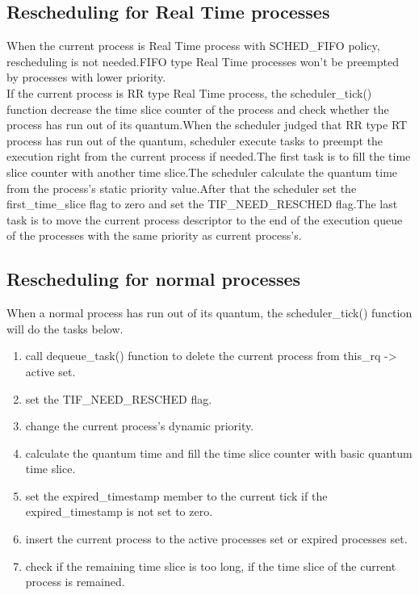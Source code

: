 \documentclass[10pt,a4paper]{ltjsarticle}       %
\begin{document}
\subsection{Rescheduling for Real Time processes}
When the current process is Real Time process with SCHED\_FIFO policy, rescheduling is not needed.FIFO type Real Time processes won't be preempted by processes with lower priority.\\
If the current process is RR type Real Time process, the scheduler\_tick() function decrease the time slice counter of the process and check whether the process has run out of its quantum.When the scheduler judged that RR type RT process has run out of the quantum, scheduler execute tasks to preempt the execution right from the current process if needed.The first task is to fill the time slice counter with another time slice.The scheduler calculate the quantum time from the process's static priority value.After that the scheduler set the first\_time\_slice flag to zero and set the TIF\_NEED\_RESCHED flag.The last task is to move the current process descriptor to the end of the execution queue of the processes with the same priority as current process's.
\subsection{Rescheduling for normal processes}
When a normal process has run out of its quantum, the scheduler\_tick() function will do the tasks below.
\begin{enumerate}
\item call dequeue\_task() function to delete the current process from this\_rq -> active set.
\item set the TIF\_NEED\_RESCHED flag.
\item change the current process's dynamic priority.
\item calculate the quantum time and fill the time slice counter with basic quantum time slice.
\item set the expired\_timestamp member to the current tick if the expired\_timestamp is not set to zero.
\item insert the current process to the active processes set or expired processes set.
\item check if the remaining time slice is too long, if the time slice of the current process is remained.
\end{enumerate}
\end{document}
